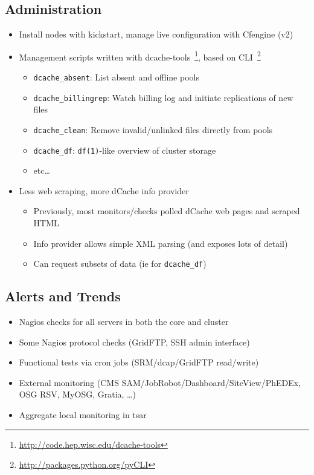 \documentclass{beamer}
\begin{document}
\subsection{Administration} %
\begin{frame}
\begin{itemize}
	\item Install nodes with kickstart, manage live configuration with Cfengine (v2)
	\item Management scripts written with dcache-tools~\footnote{\url{http://code.hep.wisc.edu/dcache-tools}}, based on CLI~\footnote{\url{http://packages.python.org/pyCLI}}
	\begin{itemize}
		\item {\tt dcache\_absent}: List absent and offline pools
		\item {\tt dcache\_billingrep}: Watch billing log and initiate replications of new files
		\item {\tt dcache\_clean}: Remove invalid/unlinked files directly from pools
		\item {\tt dcache\_df}: {\tt df(1)}-like overview of cluster storage
		\item etc\ldots{}
	\end{itemize}
	\item Less web scraping, more dCache info provider
	\begin{itemize}
		\item Previously, most monitors/checks polled dCache web pages and scraped HTML
		\item Info provider allows simple XML parsing (and exposes lots of detail)
		\item Can request subsets of data (ie for {\tt dcache\_df})
	\end{itemize}
\end{itemize}
\end{frame}

\subsection{Alerts and Trends} %
\begin{frame}
\begin{itemize}
	\item Nagios checks for all servers in both the core and cluster
	\item Some Nagios protocol checks (GridFTP, SSH admin interface)
	\item Functional tests via cron jobs (SRM/dcap/GridFTP read/write)
	\item External monitoring (CMS SAM/JobRobot/Dashboard/SiteView/PhEDEx, OSG RSV, MyOSG, Gratia, \ldots{})
	\item Aggregate local monitoring in tsar
\end{itemize}
\end{frame}
\end{document}
